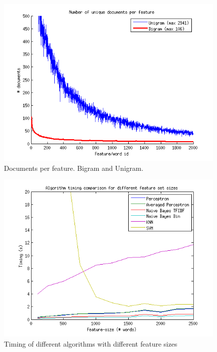 \begin{figure}[H]
\centering
\includegraphics[scale = 0.5]{../Plottar/documents_per_feature.png}
\caption{Documents per feature. Bigram and Unigram.}
\label{fig:trainingsize}
\end{figure} 

\begin{figure}[H]
\centering
\includegraphics[scale = 0.5]{../Plottar/feature_size_TIMING.png}
\caption{Timing of different algorithms with different feature sizes}
\label{fig:trainingsize}
\end{figure} 

